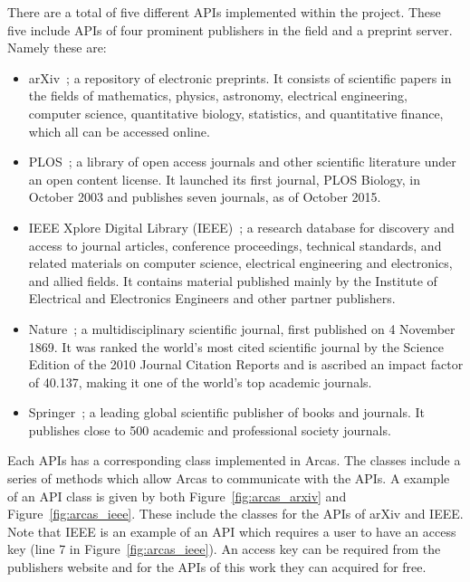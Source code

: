 There are a total of five different APIs implemented within the project. These
five include APIs of four prominent publishers in the field and a preprint
server. Namely these are:

\begin{multicols}{2}
    \begin{itemize}
        \item arXiv~\cite{mckiernan2000}; a repository of electronic preprints.
        It consists of scientific
        papers in the fields of mathematics, physics, astronomy, electrical engineering,
        computer science, quantitative biology, statistics, and quantitative finance,
        which all can be accessed online.
        \item PLOS~\cite{plos}; a library of open access journals and other scientific literature
        under an open content license. It launched its first journal, PLOS Biology,
        in October 2003 and publishes seven journals, as of October 2015.
        \item IEEE Xplore Digital Library (IEEE)~\cite{ieee}; a research database for discovery
        and access to journal articles, conference proceedings, technical standards,
        and related materials on computer science, electrical engineering and electronics,
        and allied fields. It contains material published mainly by the Institute of
        Electrical and Electronics Engineers and other partner publishers. 
        \item Nature~\cite{nature}; a multidisciplinary scientific journal,
        first published on 4 November 1869. It was ranked the world's most cited
        scientific journal by the Science Edition of the 2010 Journal Citation Reports
        and is ascribed an impact factor of 40.137, making it one of the world's
        top academic journals.
        \item Springer~\cite{springer}; a leading global scientific publisher of
        books and journals. It publishes close to 500 academic and professional
        society journals.
    \end{itemize}
\end{multicols}

Each APIs has a corresponding class implemented in Arcas. The classes include
a series of methods which allow Arcas to communicate with the APIs. A example
of an API class is given by both Figure~\ref{fig:arcas_arxiv} and Figure~\ref{fig:arcas_ieee}.
These include the classes for the APIs of arXiv and IEEE. Note that IEEE is
an example of an API which requires a user to have an access key
(line 7 in Figure~\ref{fig:arcas_ieee}). An access key can be required from the
publishers website and for the APIs of this work they can acquired for free.

